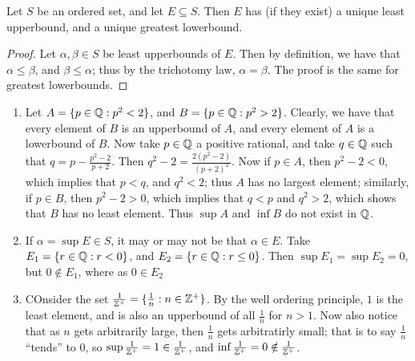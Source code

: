 \begin{lemma}\label{1.1.1}
    Let $S$ be an ordered set, and let $E \subseteq S$. Then  $E$ has (if they exist) a 
    unique least upperbound, and a unique greatest lowerbound.
\end{lemma}
\begin{proof}
    Let $\alpha, \beta \in S$ be least upperbounds of $E$. Then by definition, we have that 
    $\alpha \leq \beta$, and  $\beta \leq \alpha$; thus by the trichotomy law,  $\alpha=\beta$. The proof is the same 
    for greatest lowerbounds.
\end{proof}

\begin{example}
    \begin{enumerate}[label=(\arabic*)]
        \item Let $A=\{p \in \mathbb{Q}: p^2<2\}$, and $B=\{p \in \mathbb{Q}: p^2>2\}$. Clearly, we 
            have that every element of $B$ is an upperbound of $A$, and every element of 
             $A$ is a lowerbound of  $B$. Now take  $p \in \mathbb{Q}$ a positive rational, and 
             take  $q \in \mathbb{Q}$ such that $q=p-\frac{p^2-2}{p+2}$. Then $q^2-2=\frac{2(p^2-2)}{(p+2)^2}$. 
             Now if $p \in A$, then  $p^2-2<0$, which implies that  $p<q$, and $q^2<2$; thus 
             $A$ has no largest element; similarly, if  $p \in B$, then  $p^2-2>0$, which 
             implies that  $q<p$ and  $q^2>2$, which shows that  $B$ has no least element. Thus 
             $\sup{A}$ and  $\inf{B}$ do not exist in $\mathbb{Q}$. 

         \item If  $\alpha = \sup{E} \in S$, it may or may not be that  $\alpha \in E$. Take 
             $E_1=\{r \in \mathbb{Q}: r<0\}$, and  $E_2=\{r \in \mathbb{Q}: r \leq 0\}$. Then $\sup{E_1}=
             \sup{E_2}=0$, but $0 \notin E_1$, where as $0 \in E_2$

         \item COnsider the set $ \frac{1}{\mathbb{Z}^+}=\{\frac{1}{n}: n \in \mathbb{Z}^+\}$. By the 
             well ordering principle, $1$ is the least element, and is also an upperbound 
             of all  $ \frac{1}{n}$ for $n>1$. Now also notice that as $n$ gets arbitrarily 
             large, then  $ \frac{1}{n}$ gets arbitratirly small; that is to say $\frac{1}{n}$ 
             ``tends'' to $0$, so  $\sup{\frac{1}{\mathbb{Z}^+}}=1 \in \frac{1}{\mathbb{Z}^+}$, and 
             $\inf{\frac{1}{\mathbb{Z}^+}}=0 \notin \frac{1}{\mathbb{Z}^+}$.
    \end{enumerate}		
\end{example} 

